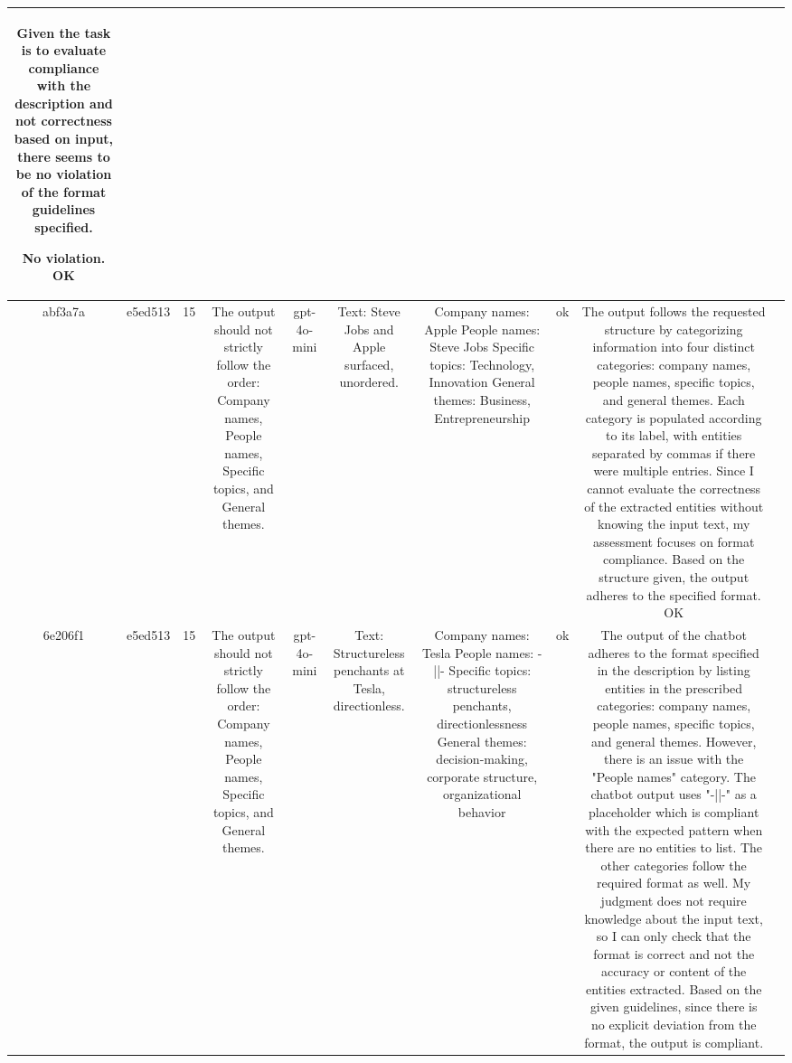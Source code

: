 \begin{table}[h!]
\begin{tabular}{|c|c|c|c|c|c|c|c|c|c|}
Given the task is to evaluate compliance with the description and not correctness based on input, there seems to be no violation of the format guidelines specified.

No violation.
OK & \\
\hline
abf3a7a & e5ed513 & 15 & The output should not strictly follow the order: Company names, People names, Specific topics, and General themes. & gpt-4o-mini & Text: Steve Jobs and Apple surfaced, unordered. & Company names: Apple  
People names: Steve Jobs  
Specific topics: Technology, Innovation  
General themes: Business, Entrepreneurship   & ok & The output follows the requested structure by categorizing information into four distinct categories: company names, people names, specific topics, and general themes. Each category is populated according to its label, with entities separated by commas if there were multiple entries. Since I cannot evaluate the correctness of the extracted entities without knowing the input text, my assessment focuses on format compliance. Based on the structure given, the output adheres to the specified format.
OK & \\
\hline
6e206f1 & e5ed513 & 15 & The output should not strictly follow the order: Company names, People names, Specific topics, and General themes. & gpt-4o-mini & Text: Structureless penchants at Tesla, directionless. & Company names: Tesla  
People names: -||-  
Specific topics: structureless penchants, directionlessness  
General themes: decision-making, corporate structure, organizational behavior   & ok & The output of the chatbot adheres to the format specified in the description by listing entities in the prescribed categories: company names, people names, specific topics, and general themes. However, there is an issue with the "People names" category. The chatbot output uses "-||-" as a placeholder which is compliant with the expected pattern when there are no entities to list. The other categories follow the required format as well. My judgment does not require knowledge about the input text, so I can only check that the format is correct and not the accuracy or content of the entities extracted. Based on the given guidelines, since there is no explicit deviation from the format, the output is compliant.


\end{tabular}
\end{table}
